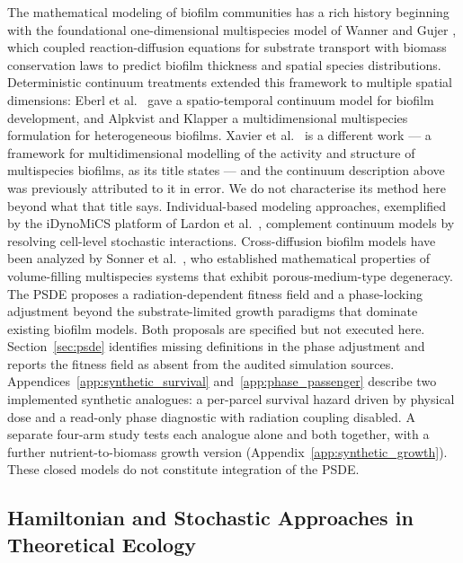 \documentclass[11pt]{article}
\begin{document}
The mathematical modeling of biofilm communities has a rich history beginning with the
foundational one-dimensional multispecies model of Wanner and Gujer \cite{wanner1986}, which
coupled reaction-diffusion equations for substrate transport with biomass conservation laws to
predict biofilm thickness and spatial species distributions. Deterministic continuum treatments
extended this framework to multiple spatial dimensions: Eberl et al.\ \cite{eberl2001} gave a
spatio-temporal continuum model for biofilm development, and Alpkvist and Klapper
\cite{alpkvist2007} a multidimensional multispecies formulation for heterogeneous biofilms.
Xavier et al.\ \cite{xavier2005} is a different work --- a framework for multidimensional
modelling of the activity and structure of multispecies biofilms, as its title states --- and
the continuum description above was previously attributed to it in error. We do not
characterise its method here beyond what that title says. Individual-based modeling
approaches, exemplified
by the iDynoMiCS platform of Lardon et al.\ \cite{lardon2011}, complement continuum models by
resolving cell-level stochastic interactions. Cross-diffusion biofilm models have been analyzed
by Sonner et al.\ \cite{sonner2015}, who established mathematical properties of volume-filling
multispecies systems that exhibit porous-medium-type degeneracy. The PSDE proposes a
radiation-dependent fitness field and a phase-locking adjustment beyond the substrate-limited
growth paradigms that dominate existing biofilm models. Both proposals are specified but not
executed here.
Section~\ref{sec:psde} identifies missing definitions in the phase adjustment and reports the
fitness field as absent from the audited simulation sources. Appendices~\ref{app:synthetic_survival}
and~\ref{app:phase_passenger} describe two implemented synthetic analogues: a per-parcel survival
hazard driven by physical dose and a read-only phase diagnostic with radiation coupling disabled.
A separate four-arm study tests each analogue alone and both together, with a further
nutrient-to-biomass growth version (Appendix~\ref{app:synthetic_growth}). These closed
models do not constitute integration of the PSDE.

\subsection{Hamiltonian and Stochastic Approaches in Theoretical Ecology}
\end{document}
